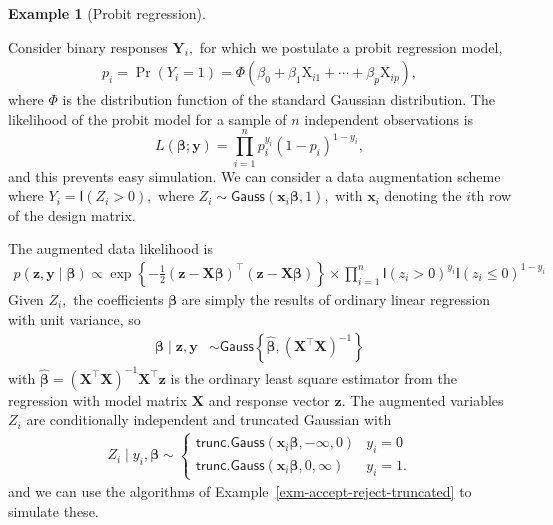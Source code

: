 \documentclass[
  11pt,
  letterpaper,
]{scrbook}
\theoremstyle{plain}
\theoremstyle{definition}
\theoremstyle{definition}
\newtheorem{example}{Example}[chapter]
\theoremstyle{plain}
\theoremstyle{plain}
\theoremstyle{definition}
\theoremstyle{remark}
\begin{document}
\begin{example}[Probit
regression]\protect\hypertarget{exm-probit-regression}{}\label{exm-probit-regression}

Consider binary responses \(\boldsymbol{Y}_i,\) for which we postulate a
probit regression model, \begin{align*}
p_i = \Pr(Y_i=1) = \Phi(\beta_0 + \beta_1 \mathrm{X}_{i1} + \cdots + \beta_p\mathrm{X}_{ip}),
\end{align*} where \(\Phi\) is the distribution function of the standard
Gaussian distribution. The likelihood of the probit model for a sample
of \(n\) independent observations is
\[L(\boldsymbol{\beta}; \boldsymbol{y}) = \prod_{i=1}^n p_i^{y_i}(1-p_i)^{1-y_i},\]
and this prevents easy simulation. We can consider a data augmentation
scheme where \(Y_i = \mathsf{I}(Z_i > 0),\) where
\(Z_i \sim \mathsf{Gauss}(\mathbf{x}_i\boldsymbol{\beta}, 1),\) with
\(\mathbf{x}_i\) denoting the \(i\)th row of the design matrix.

The augmented data likelihood is \begin{align*}
p(\boldsymbol{z}, \boldsymbol{y} \mid \boldsymbol{\beta}) \propto \exp\left\{-\frac{1}{2}(\boldsymbol{z} - \mathbf{X}\boldsymbol{\beta})^\top(\boldsymbol{z} - \mathbf{X}\boldsymbol{\beta})\right\} \times \prod_{i=1}^n \mathsf{I}(z_i > 0)^{y_i}\mathsf{I}(z_i \le 0)^{1-y_i}
\end{align*} Given \(Z_i,\) the coefficients \(\boldsymbol{\beta}\) are
simply the results of ordinary linear regression with unit variance, so
\begin{align*}
\boldsymbol{\beta} \mid \boldsymbol{z}, \boldsymbol{y} &\sim \mathsf{Gauss}\left\{\widehat{\boldsymbol{\beta}}, (\mathbf{X}^\top\mathbf{X})^{-1}\right\}
\end{align*} with
\(\widehat{\boldsymbol{\beta}}=(\mathbf{X}^\top\mathbf{X})^{-1}\mathbf{X}^\top\boldsymbol{z}\)
is the ordinary least square estimator from the regression with model
matrix \(\mathbf{X}\) and response vector \(\boldsymbol{z}.\) The
augmented variables \(Z_i\) are conditionally independent and truncated
Gaussian with \begin{align*}
Z_i \mid y_i, \boldsymbol{\beta} \sim \begin{cases}
\mathsf{trunc. Gauss}(\mathbf{x}_i\boldsymbol{\beta}, -\infty, 0) & y_i =0 \\
\mathsf{trunc. Gauss}(\mathbf{x}_i\boldsymbol{\beta}, 0, \infty) & y_i =1.
\end{cases}
\end{align*} and we can use the algorithms of
Example~\ref{exm-accept-reject-truncated} to simulate these.


\end{example}
\end{document}
